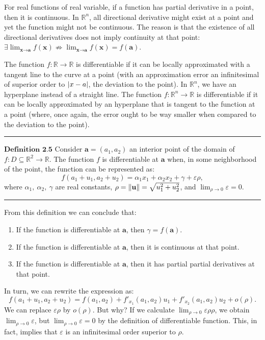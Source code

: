 \documentclass[0pt, a4paper]{article}
\begin{document}
For real functions of real variable, if a function has partial derivative in a point, then it is continuous. In $\mathbb{R}^n$, all directional derivative might exist at a point and yet the function might not be continuous. The reason is that the existence of all directional derivatives does not imply continuity at that point: $\exists \lim_{\textbf{x}\to\textbf{a}}f(\textbf{x})\not\Rightarrow\lim_{\textbf{x}\to\textbf{a}}f(\textbf{x})=f(\textbf{a})$.

The function $f:\mathbb{R}\to\mathbb{R}$ is differentiable if it can be locally approximated with a tangent line to the curve at a point (with an approximation error an infinitesimal of superior order to $\abs{x-a}$, the deviation to the point). In $\mathbb{R}^n$, we have an hyperplane instead of a straight line. The function $f:\mathbb{R}^n\to\mathbb{R}$ is differentiable if it can be locally approximated by an hyperplane that is tangent to the function at a point (where, once again, the error ought to be way smaller when compared to the deviation to the point).

\noindent\rule{\textwidth}{1pt}

$\textbf{Definition 2.5}$ Consider $\textbf{a}=(a_1, a_2)$ an interior point of the domain of $f:D\subseteq\mathbb{R}^2\to\mathbb{R}$. The function $f$ is differentiable at $\textbf{a}$ when, in some neighborhood of the point, the function can be represented as:
$$f(a_1+u_1, a_2+u_2)=\alpha_1x_1+\alpha_2x_2 +\gamma+\varepsilon\rho,$$
where $\alpha_1,\ \alpha_2,\ \gamma$ are real constants, $\rho=\norm{\textbf{u}}=\sqrt{u_1^2+u_2^2}$, and $\lim_{\rho\to0}\varepsilon=0$.

\noindent\rule{\textwidth}{1pt}

From this definition we can conclude that:
\begin{enumerate}
	\item If the function is differentiable at $\textbf{a}$, then $\gamma=f(\textbf{a})$.
	\item If the function is differentiable at $\textbf{a}$, then it is continuous at that point.
	\item If the function is differentiable at $\textbf{a}$, then it has partial partial derivatives at that point.
\end{enumerate}

In turn, we can rewrite the expression as:
$$f(a_1+u_1, a_2+u_2)=f(a_1,a_2)+f'_{x_1}(a_1,a_2)u_1 + f'_{x_2}(a_1,a_2)u_2+o(\rho).$$ 
We can replace $\varepsilon\rho$ by $o(\rho)$. But why? If we calculate $\lim_{\rho\to0}\varepsilon\rho\rho$, we obtain $\lim_{\rho\to0}\varepsilon$, but $\lim_{\rho\to0}\varepsilon=0$ by the definition of differentiable function. This, in fact, implies that $\varepsilon$ is an infinitesimal order superior to $\rho$.
\end{document}
